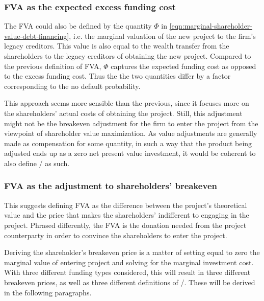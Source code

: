 \documentclass[../main.tex]{subfiles}
\begin{document}
        \subsubsection*{FVA as the expected excess funding cost}
            The FVA could also be defined by the quantity $\Phi$ in \cref{eqn:marginal-shareholder-value-debt-financing}, 
            i.e. the marginal valuation of the new project to the firm's legacy creditors. 
            This value is also equal to the wealth transfer from the shareholders to the legacy creditors
            of obtaining the new project.
            Compared to the previous definition of FVA, 
            $\Phi$ captures the expected funding cost as opposed to the excess funding cost.
            Thus the the two quantities differ by a factor corresponding to the no default probability.

            This approach seems more sensible than the previous, 
            since it focuses more on the shareholders' actual costs of obtaining the project.
            Still, this adjustment might not be the breakeven adjustment
            for the firm to enter the project from the viewpoint of shareholder value maximization.
            As value adjustments are generally made as compensation for some quantity,
            in such a way that the product being adjusted ends up as a zero net present value investment,
            it would be coherent to also define \FVA/ as such.
            
        \subsubsection*{FVA as the adjustment to shareholders' breakeven}
            This suggests defining FVA as the difference between the project's theoretical value
            and the price that makes the shareholders' indifferent to engaging in the project.
            Phrased differently, the FVA is the donation needed from the project counterparty in order
            to convince the shareholders to enter the project.

            Deriving the shareholder's breakeven price
            is a matter of setting equal to zero the marginal value of entering project 
            and solving for the marginal investment cost. 
            With three different funding types considered, this will result in three different breakeven prices,
            as well as three different definitions of \FVA/.
            These will be derived in the following paragraphs.
            
\end{document}

